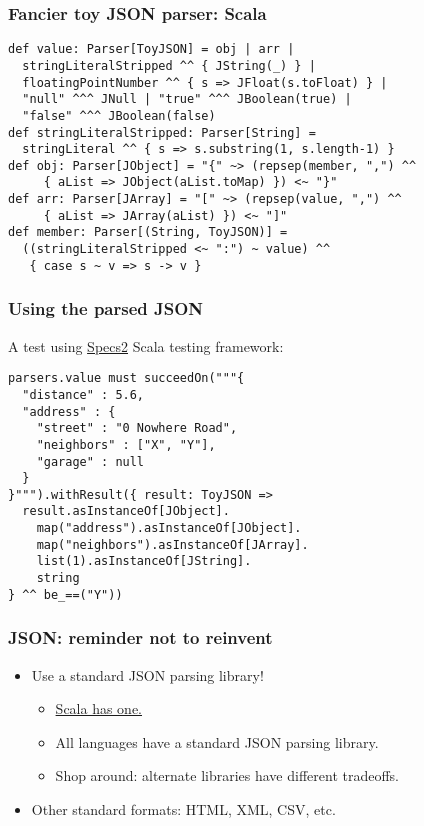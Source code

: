 \begin{frame}[fragile]
  \frametitle{Fancier toy JSON parser: Scala}

  \begin{verbatim}
def value: Parser[ToyJSON] = obj | arr |
  stringLiteralStripped ^^ { JString(_) } |
  floatingPointNumber ^^ { s => JFloat(s.toFloat) } |
  "null" ^^^ JNull | "true" ^^^ JBoolean(true) |
  "false" ^^^ JBoolean(false)
def stringLiteralStripped: Parser[String] =
  stringLiteral ^^ { s => s.substring(1, s.length-1) }
def obj: Parser[JObject] = "{" ~> (repsep(member, ",") ^^
     { aList => JObject(aList.toMap) }) <~ "}"
def arr: Parser[JArray] = "[" ~> (repsep(value, ",") ^^
     { aList => JArray(aList) }) <~ "]"
def member: Parser[(String, ToyJSON)] =
  ((stringLiteralStripped <~ ":") ~ value) ^^
   { case s ~ v => s -> v }
  \end{verbatim}
\end{frame}

\begin{frame}[fragile]
  \frametitle{Using the parsed JSON}

  A test using \href{http://etorreborre.github.io/specs2/}{Specs2} Scala testing framework:

  \begin{verbatim}
parsers.value must succeedOn("""{
  "distance" : 5.6,
  "address" : {
    "street" : "0 Nowhere Road",
    "neighbors" : ["X", "Y"],
    "garage" : null
  }
}""").withResult({ result: ToyJSON =>
  result.asInstanceOf[JObject].
    map("address").asInstanceOf[JObject].
    map("neighbors").asInstanceOf[JArray].
    list(1).asInstanceOf[JString].
    string
} ^^ be_==("Y"))
  \end{verbatim}
\end{frame}

\begin{frame}
  \frametitle{JSON: reminder not to reinvent}

  \begin{itemize}
    \item<1-> Use a standard JSON parsing library!
      \begin{itemize}
        \item<2-> \href{http://www.scala-lang.org/api/current/index.html\#scala.util.parsing.json.JSON$}{Scala has one.}
        \item<3-> All languages have a standard JSON parsing library.
        \item<4-> Shop around: alternate libraries have different tradeoffs.
      \end{itemize}
    \item<5-> Other standard formats: HTML, XML, CSV, etc.
  \end{itemize}
\end{frame}


